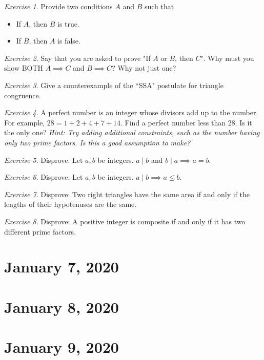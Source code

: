 \documentclass[11pt]{article}
\theoremstyle{plain}
\theoremstyle{definition}
\theoremstyle{remark}
\newtheorem{exc}{Exercise}[section]
\begin{document}
\begin{exc}
    Provide two conditions $A$ and $B$ such that
    \begin{itemize}
        \item If $A$, then $B$ is true.
        \item If $B$, then $A$ is false.
    \end{itemize}
\end{exc}
\begin{exc}
    Say that you are asked to prove "If $A$ or $B$, then $C$". Why must you show BOTH $A \implies C$ and $B \implies C$? Why not just one?
\end{exc}
\begin{exc}
    Give a counterexample of the ``SSA" postulate for triangle congruence.
\end{exc}
\begin{exc}
    A perfect number is an integer whose divisors add up to the number. For example, $28 = 1 + 2 + 4 + 7 + 14$. Find a perfect number less than 28. Is it the only one? {\it Hint: Try adding additional constraints, such as the number having only two prime factors. Is this a good assumption to make?}
\end{exc}
\begin{exc}
    Disprove: Let $a, b$ be integers. $a \mid b$ and $b \mid a \implies a = b$.
\end{exc}
\begin{exc}
    Disprove: Let $a, b$ be integers. $a \mid b \implies a \leq b$.
\end{exc}
\begin{exc}
    Disprove: Two right triangles have the same area if and only if the lengths of their hypotenuses are the same.
\end{exc}
\begin{exc}
    Disprove: A positive integer is composite if and only if it has two different prime factors.
\end{exc}

\section{January 7, 2020}

\section{January 8, 2020}

\section{January 9, 2020}
\end{document}
